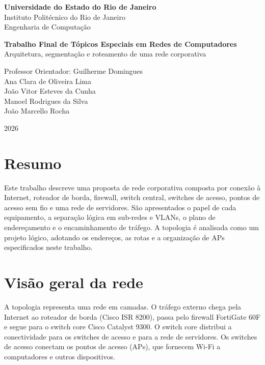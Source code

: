 \documentclass[11pt,a4paper]{article}
\begin{document}
\hypersetup{pageanchor=false}
\begin{titlepage}
\thispagestyle{empty}
\begin{center}
{\large\bfseries Universidade do Estado do Rio de Janeiro}\\[0.4em]
{\large Instituto Politécnico do Rio de Janeiro}\\[0.4em]
{\large Engenharia de Computação}

\vfill

{\LARGE\bfseries Trabalho Final de Tópicos Especiais em Redes de Computadores}\\[1em]
{\Large Arquitetura, segmentação e roteamento de uma rede corporativa}

\vfill

{\large Professor Orientador: Guilherme Domingues}\\[0.8em]
{\large Ana Clara de Oliveira Lima}\\[0.3em]
{\large João Vitor Esteves da Cunha}\\[0.3em]
{\large Manoel Rodrigues da Silva}\\[0.3em]
{\large João Marcello Rocha}

\vfill

{\large 2026}
\end{center}
\end{titlepage}

\hypersetup{pageanchor=true}
\thispagestyle{plain}
\section*{Resumo}
Este trabalho descreve uma proposta de rede corporativa composta por conexão à Internet, roteador de borda, firewall, switch central, switches de acesso, pontos de acesso sem fio e uma rede de servidores. São apresentados o papel de cada equipamento, a separação lógica em sub-redes e VLANs, o plano de endereçamento e o encaminhamento de tráfego. A topologia é analisada como um projeto lógico, adotando os endereços, as rotas e a organização de APs especificados neste trabalho.

\clearpage
\thispagestyle{plain}
\tableofcontents
\clearpage
{}

\section{Visão geral da rede}

A topologia representa uma rede em camadas. O tráfego externo chega pela Internet ao roteador de borda (Cisco ISR 8200), passa pelo firewall FortiGate 60F e segue para o switch core Cisco Catalyst 9300. O switch core distribui a conectividade para os switches de acesso e para a rede de servidores. Os switches de acesso conectam os pontos de acesso (APs), que fornecem Wi-Fi a computadores e outros dispositivos.
\end{document}
